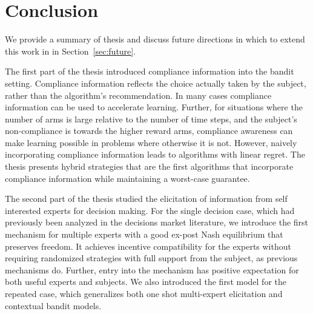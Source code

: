 \chapter{Conclusion}
\label{cha:conc}

We provide a summary of thesis and discuss future directions in which to extend this work in in Section~\ref{sec:future}.


The first part of the thesis introduced compliance information into the bandit setting. 
Compliance information reflects the choice actually taken by the subject, rather than the algorithm's recommendation. 
In many cases compliance information can be used to accelerate learning.
Further, for situations where the number of arms is large relative to the number of time steps, and the subject's non-compliance is towards the higher reward arms, compliance awareness can make learning possible in problems where otherwise it is not. 
However, naively incorporating compliance information leads to algorithms with linear regret.
The thesis presents hybrid strategies that are the first algorithms that incorporate compliance information while maintaining a worst-case guarantee. 

The second part of the thesis studied the elicitation of information from self interested experts for decision making.
For the single decision case, which had previously been analyzed in the decisions market literature, we introduce the first mechanism for multiple experts with a good ex-post Nash equilibrium that preserves freedom.
It achieves incentive compatibility for the experts without requiring randomized strategies with full support from the subject, as previous mechanisms do. Further, entry into the mechanism has positive expectation for both useful experts and subjects.
We also introduced the first model for the repeated case, which generalizes both one shot multi-expert elicitation and contextual bandit models.



